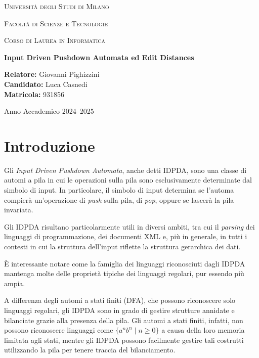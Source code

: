 \documentclass[a4paper,12pt]{report}
\theoremstyle{propositionstyle}
\begin{document}
    \begin{titlepage}
        \centering
        {\scshape\LARGE Università degli Studi di Milano \par}
        \vspace{1cm}
        {\scshape\Large Facoltà di Scienze e Tecnologie \par}
        \vspace{0.5cm}
        {\scshape\large Corso di Laurea in Informatica\par}
        \vspace{2cm}
        {\huge\bfseries Input Driven Pushdown Automata ed Edit Distances\par}
        \vspace{2cm}
        \begin{flushleft}
            \textbf{Relatore:} Giovanni Pighizzini\\
            \textbf{Candidato:} Luca Casnedi\\
            \textbf{Matricola:} 931856
        \end{flushleft}
        \vfill
        {\large Anno Accademico 2024--2025\par}
    \end{titlepage}

    \tableofcontents
    \clearpage



    \chapter{Introduzione}

    Gli \emph{Input Driven Pushdown Automata}, anche detti IDPDA, sono una classe di automi a pila in cui le operazioni sulla pila sono esclusivamente determinate dal simbolo di input.
    In particolare, il simbolo di input determina se l'automa compierà un'operazione di \emph{push} sulla pila, di \emph{pop}, oppure se lascerà la pila invariata.

    Gli IDPDA risultano particolarmente utili in diversi ambiti, tra cui il \emph{parsing} dei linguaggi di programmazione, dei documenti XML e, più in generale, in tutti i contesti in cui la struttura dell'input riflette la struttura gerarchica dei dati.

    È interessante notare come la famiglia dei linguaggi riconosciuti dagli IDPDA mantenga molte delle proprietà tipiche dei linguaggi regolari, pur essendo più ampia.

    A differenza degli automi a stati finiti (DFA), che possono riconoscere solo linguaggi regolari, gli IDPDA sono in grado di gestire strutture annidate e bilanciate grazie alla presenza della pila.
    Gli automi a stati finiti, infatti, non possono riconoscere linguaggi come $\{a^n b^n \mid n \geq 0\}$ a causa della loro memoria limitata agli stati, mentre gli IDPDA possono facilmente gestire tali costrutti utilizzando la pila per tenere traccia del bilanciamento.
\end{document}
